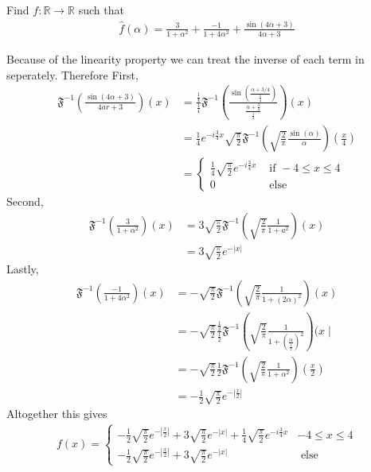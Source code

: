 \documentclass[11pt]{article}
\begin{document}
\begin{exercise}
    Find $f : \mathbb R \to \mathbb R$ such that 
    \begin{align*}
        \hat f(\alpha) = \frac{3}{1+\alpha^{2}} + \frac{-1}{1+4\alpha^{2}} + \frac{ \sin( 4 \alpha + 3 ) }{ 4 \alpha + 3 }
    \end{align*}
\end{exercise}
\begin{solution}   Because of the linearity property we can treat the inverse of each term in seperately. Therefore 
    First,
    \begin{align*} 
        \mathfrak{F}^{-1}\left(\frac{\sin (4 \alpha+3)}{4 a r+3}\right)(x) & =\frac{\frac{1}{4}}{\frac{1}{4}} \mathfrak{F}^{-1}\left(\frac{\sin \left(\frac{\alpha+3 / 4}{\frac{1}{4}}\right)}{\frac{\alpha+\frac{3}{4}}{\frac{1}{4}}}\right)(x) \\ & =\frac{1}{4} e^{-i \frac{3}{4} x} \sqrt{\frac{\pi}{2}} \mathfrak{F}^{-1}\left(\sqrt{\frac{2}{\pi}} \frac{\sin (\alpha)}{\alpha}\right)\left(\frac{x}{4}\right) \\ & = \begin{cases}\frac{1}{4} \sqrt{\frac{\pi}{2}} e^{-i \frac{3}{4} x} & \text { if }-4 \leq x \leq 4 \\ 0 & \text { else }\end{cases} 
    \end{align*}
    Second,
    \begin{align*} 
        \mathfrak{F}^{-1}\left(\frac{3}{1+\alpha^2}\right)(x) & =3 \sqrt{\frac{\pi}{2}} \mathfrak{F}^{-1}\left(\sqrt{\frac{2}{\pi}} \frac{1}{1+a^2}\right)(x) \\ & =3 \sqrt{\frac{\pi}{2}} e^{-|x|}
    \end{align*}
    Lastly,
    \begin{align*} 
        \mathfrak{F}^{-1}\left(\frac{-1}{1+4 \alpha^2}\right)(x) & =-\sqrt{\frac{\pi}{2}} \mathfrak{F}^{-1}\left(\sqrt{\frac{2}{\pi}} \frac{1}{1+(2 \alpha)^2}\right)(x) \\ & =-\sqrt{\frac{\pi}{2}} \frac{\frac{1}{2}}{\frac{1}{2}} \mathfrak{F}^{-1}\left(\sqrt{\frac{2}{\pi}} \frac{1}{1+\left(\frac{\alpha}{\frac{1}{2}}\right)^2}\right)(x \mid \\ & =-\sqrt{\frac{\pi}{2}} \frac{1}{2} \mathfrak{F}^{-1}\left(\sqrt{\frac{2}{\pi}} \frac{1}{1+\alpha^2}\right)\left(\frac{x}{2}\right) \\ & =-\frac{1}{2} \sqrt{\frac{\pi}{2}} e^{-\left|\frac{x}{2}\right|}
    \end{align*}
    Altogether this gives
    \begin{align*} 
        f(x) = \begin{cases}-\frac{1}{2} \sqrt{\frac{\pi}{2}} e^{-\left|\frac{x}{2}\right|}+3 \sqrt{\frac{\pi}{2}} e^{-|x|}+\frac{1}{4} \sqrt{\frac{\pi}{2}} e^{-i \frac{3}{4} x} & -4 \leq x \leq 4 \\ -\frac{1}{2} \sqrt{\frac{\pi}{2}} e^{-\left|\frac{x}{2}\right|}+3 \sqrt{\frac{\pi}{2}} e^{-|x|} & \text { else }\end{cases}
    \end{align*}
    
\end{solution}
\end{document}
